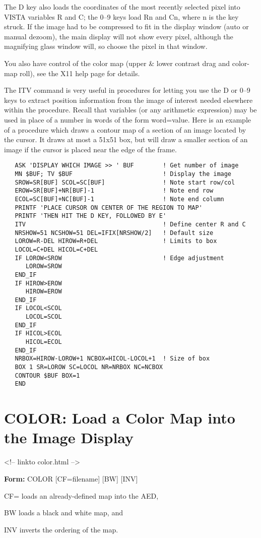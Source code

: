 The D key also loads the coordinates of the most recently selected pixel
into VISTA variables R and C; the 0--9 keys load Rn and Cn, where n is the
key struck.  If the image had to be compressed to fit in the display window
(auto or manual dezoom), the main display will not show every pixel,
although the magnifying glass window will, so choose the pixel in that
window.

You also have control of the color map (upper \& lower contrast drag and
color-map roll), see the X11 help page for details.

The ITV command is very useful in procedures for letting you use the D or
0--9 keys to extract position information from the image of interest needed
elsewhere within the procedure.  Recall that variables (or any arithmetic
expression) may be used in place of a number in words of the form
word=value.  Here is an example of a procedure which draws a contour map of
a section of an image located by the cursor.  It draws at most a 51x51 box,
but will draw a smaller section of an image if the cursor is placed near
the edge of the frame.

\begin{verbatim}
   ASK 'DISPLAY WHICH IMAGE >> ' BUF        ! Get number of image
   MN $BUF; TV $BUF                         ! Display the image
   SROW=SR[BUF] SCOL=SC[BUF]                ! Note start row/col
   EROW=SR[BUF]+NR[BUF]-1                   ! Note end row
   ECOL=SC[BUF]+NC[BUF]-1                   ! Note end column
   PRINTF 'PLACE CURSOR ON CENTER OF THE REGION TO MAP'
   PRINTF 'THEN HIT THE D KEY, FOLLOWED BY E'
   ITV                                      ! Define center R and C
   NRSHOW=51 NCSHOW=51 DEL=IFIX[NRSHOW/2]   ! Default size
   LOROW=R-DEL HIROW=R+DEL                  ! Limits to box
   LOCOL=C+DEL HICOL=C+DEL
   IF LOROW<SROW                            ! Edge adjustment
      LOROW=SROW
   END_IF
   IF HIROW>EROW
      HIROW=EROW
   END_IF
   IF LOCOL<SCOL
      LOCOL=SCOL
   END_IF
   IF HICOL>ECOL
      HICOL=ECOL
   END_IF
   NRBOX=HIROW-LOROW+1 NCBOX=HICOL-LOCOL+1  ! Size of box
   BOX 1 SR=LOROW SC=LOCOL NR=NRBOX NC=NCBOX
   CONTOUR $BUF BOX=1
   END
\end{verbatim}

\section{COLOR: Load a Color Map into the Image Display}
\begin{rawhtml}
<!-- linkto color.html -->
\end{rawhtml}
\begin{command}
  \item[\textbf{Form: }COLOR {[CF=filename]} {[BW]} {[INV]}\hfill]{}
  \item[CF=]{loads an already-defined map into the AED,}
  \item[BW]{loads a black and white map, and}
  \item[INV]{inverts the ordering of the map.}
\end{command}

